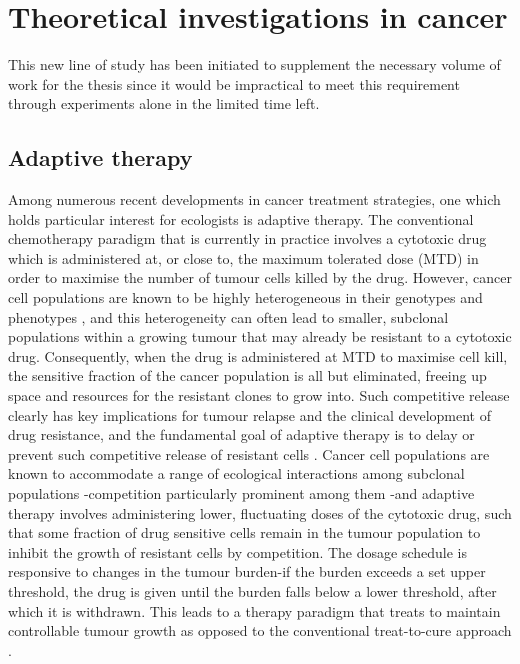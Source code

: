 \documentclass[12pt,onecolumn,twoside]{article}
\begin{document}
	\section{Theoretical investigations in cancer}
	This new line of study has been initiated to supplement the necessary volume of work for the thesis since it would be impractical to meet this requirement through experiments alone in the limited time left.

	\subsection{Adaptive therapy}
	Among numerous recent developments in cancer treatment strategies, one which holds particular interest for ecologists is adaptive therapy. The conventional chemotherapy paradigm that is currently in practice involves a cytotoxic drug which is administered at, or close to, the maximum tolerated dose (MTD) in order to maximise the number of tumour cells killed by the drug. However, cancer cell populations are known to be highly heterogeneous in their genotypes and phenotypes \citep{DENTRO20212239, Shen2020a, Geiler-Samerotte2013, Hu2016}, and this heterogeneity can often lead to smaller, subclonal populations within a growing tumour that may already be resistant to a cytotoxic drug. Consequently, when the drug is administered at MTD to maximise cell kill, the sensitive fraction of the cancer population is all but eliminated, freeing up space and resources for the resistant clones to grow into. Such competitive release clearly has key implications for tumour relapse and the clinical development of drug resistance, and the fundamental goal of adaptive therapy is to delay or prevent such competitive release of resistant cells \citep{Gatenby2009}. Cancer cell populations are known to accommodate a range of ecological interactions among subclonal populations \citep{KotlerBrown2020}-competition particularly prominent among them \citep{Parker2020}-and adaptive therapy involves administering lower, fluctuating doses of the cytotoxic drug, such that some fraction of drug sensitive cells remain in the tumour population to inhibit the growth of resistant cells by competition. The dosage schedule is responsive to changes in the tumour burden-if the burden exceeds a set upper threshold, the drug is given until the burden falls below a lower threshold, after which it is withdrawn. This leads to a therapy paradigm that treats to maintain controllable tumour growth as opposed to the conventional treat-to-cure approach \citep{Hansen2017a, Hansen2020a}.
\end{document}

